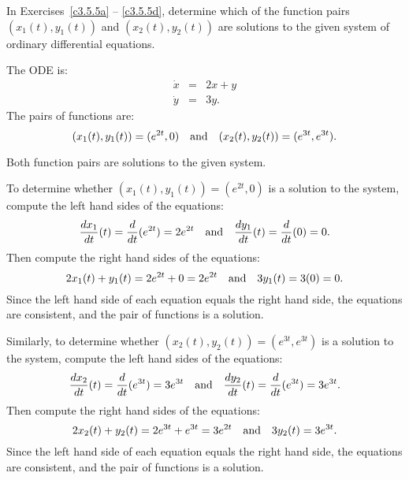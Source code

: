 \documentclass{ximera}
\begin{document}
\noindent In Exercises~\ref{c3.5.5a} -- \ref{c3.5.5d}, determine which of
the function pairs $(x_1(t),y_1(t))$ and $(x_2(t),y_2(t))$ are solutions
to the given system of ordinary differential equations.
\begin{computerExercise} \label{c3.5.5a}
The ODE is:
\begin{eqnarray*}
\dot{x} & = & 2x+y  \\
\dot{y} & = & 3y.
\end{eqnarray*}
The pairs of functions are:
\[
(x_1(t),y_1(t)) = (e^{2t},0)  \quad\mbox{and}\quad (x_2(t),y_2(t)) = (e^{3t},e^{3t}).
\]

\begin{solution}
\ans Both function pairs are solutions to the given system.

\soln To determine whether $(x_1(t),y_1(t)) = (e^{2t},0)$ is
a solution to the system, compute the left hand sides of the equations:
\[
\frac{dx_1}{dt}(t) = \frac{d}{dt}(e^{2t}) = 2e^{2t} \quad\mbox{and}\quad
\frac{dy_1}{dt}(t) = \frac{d}{dt}(0) = 0.
\]
Then compute the right hand sides of the equations:
\[
2x_1(t) + y_1(t) = 2e^{2t} + 0 = 2e^{2t} \quad\mbox{and}\quad
3y_1(t) = 3(0) = 0.
\]
Since the left hand side of each equation equals the right hand side, the
equations are consistent, and the pair of functions is a solution.

\para Similarly, to determine whether $(x_2(t),y_2(t)) = (e^{3t},e^{3t})$
is a solution to the system, compute the left hand sides of the equations:
\[
\frac{dx_2}{dt}(t) = \frac{d}{dt}(e^{3t}) = 3e^{3t} \quad\mbox{and}\quad
\frac{dy_2}{dt}(t) = \frac{d}{dt}(e^{3t}) = 3e^{3t}.
\]
Then compute the right hand sides of the equations:
\[
2x_2(t) + y_2(t) = 2e^{3t} + e^{3t} = 3e^{2t} \quad\mbox{and}\quad
3y_2(t) = 3e^{3t}.
\]
Since the left hand side of each equation equals the right hand side, the
equations are consistent, and the pair of functions is a solution.


\end{solution}
\end{computerExercise}
\end{document}
